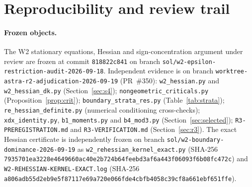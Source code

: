 \documentclass[11pt]{article}
\numberwithin{equation}{section}
\theoremstyle{definition}
\theoremstyle{remark}
\begin{document}
\appendix
\section{Reproducibility and review trail}\label{app:repro}

\paragraph{Frozen objects.}
The W2 stationary equations, Hessian and sign-concentration argument under review
are frozen at commit \texttt{818822c841} on branch
\texttt{sol/w2-epsilon-restriction-audit-2026-09-18}. Independent evidence is on
branch \texttt{worktree-astra-r2-adjudication-2026-09-19} (PR~\#350):
\texttt{w2\_hessian.py} and \texttt{w2\_hessian\_dk.py} (Section~\ref{sec:s4});
\texttt{nongeometric\_criticals.py} (Proposition~\ref{prop:crit});
\texttt{boundary\_strata\_res.py} (Table~\ref{tab:strata});
\texttt{re\_hessian\_definite.py} (numerical conditioning cross-checks);
\texttt{xdx\_identity.py}, \texttt{b1\_moments.py} and \texttt{b4\_mod3.py}
(Section~\ref{sec:selected}); \texttt{R3-PREREGISTRATION.md} and
\texttt{R3-VERIFICATION.md} (Section~\ref{sec:r3}). The exact Hessian
certificate is independently frozen on branch
\texttt{sol/w2-boundary-dominance-2026-09-19} as
\texttt{w2\_rehessian\_kernel\_exact.py} (SHA-256
\texttt{7935701ea3228e4649660ac40e2b724b64feebd3af6a443f06093f6b08fc472c})
and \texttt{W2-REHESSIAN-KERNEL-EXACT.log} (SHA-256
\texttt{a806adb55d2eb9e5f87117e69a720e066fde4cbfb4058c39cf8a661ebf651ffe}).
\end{document}
